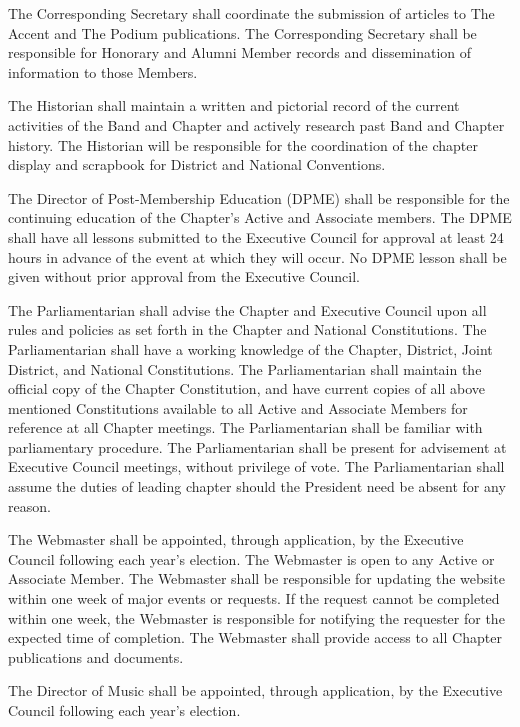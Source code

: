 \documentclass[11pt]{article}
\begin{document}
\begin{legal}
    The Corresponding Secretary shall coordinate the submission of articles to The Accent and The Podium publications.
    The Corresponding Secretary shall be responsible for Honorary and Alumni Member records and dissemination of information to those Members.
  \item
    The Historian shall maintain a written and pictorial record of the current activities of the Band and Chapter and actively research past Band and Chapter history.
    The Historian will be responsible for the coordination of the chapter display and scrapbook for District and National Conventions.
  \item
    The Director of Post-Membership Education (DPME) shall be responsible for the continuing education of the Chapter’s Active and Associate members.
    The DPME shall have all lessons submitted to the Executive Council for approval at least 24 hours in advance of the event at which they will occur.
    No DPME lesson shall be given without prior approval from the Executive Council.
  \item
    The Parliamentarian shall advise the Chapter and Executive Council upon all rules and policies as set forth in the Chapter and National Constitutions.
    The Parliamentarian shall have a working knowledge of the Chapter, District, Joint District, and National Constitutions.
    The Parliamentarian shall maintain the official copy of the Chapter Constitution, and have current copies of all above mentioned Constitutions available to all Active and Associate Members for reference at all Chapter meetings.
    The Parliamentarian shall be familiar with parliamentary procedure.
    The Parliamentarian shall be present for advisement at Executive Council meetings, without privilege of vote.
    The Parliamentarian shall assume the duties of leading chapter should the President need be absent for any reason. 
  \item
    The Webmaster shall be appointed, through application, by the Executive Council following each year’s election.
    The Webmaster is open to any Active or Associate Member.
    The Webmaster shall be responsible for updating the website within one week of major events or requests.
    If the request cannot be completed within one week, the Webmaster is responsible for notifying the requester for the expected time of completion.
    The Webmaster shall provide access to all Chapter publications and documents.
  \item
    The Director of Music shall be appointed, through application, by the Executive Council following each year’s election.

\end{legal}
\end{document}

